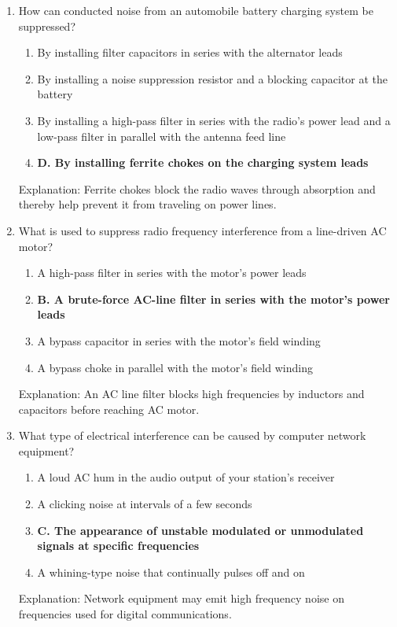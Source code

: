 \begin{enumerate}
   \item How can conducted noise from an automobile battery charging system be suppressed?
     \begin{enumerate}
    \item  By installing filter capacitors in series with the alternator leads
        \item  By installing a noise suppression resistor and a blocking capacitor at the battery
       \item  By installing a high-pass filter in series with the radio's power lead and a low-pass filter in parallel with the antenna feed line
     \item \textbf{D. By installing ferrite chokes on the charging system leads}
       \end{enumerate}
      \textcolor{myred}{Explanation:}
      Ferrite chokes block the radio waves through absorption and thereby help prevent it from traveling on power lines.

  \item What is used to suppress radio frequency interference from a line-driven AC motor?
        \begin{enumerate}
          \item  A high-pass filter in series with the motor's power leads
        \item \textbf{B. A brute-force AC-line filter in series with the motor's power leads}
         \item  A bypass capacitor in series with the motor's field winding
        \item  A bypass choke in parallel with the motor's field winding
        \end{enumerate}
   \textcolor{myred}{Explanation:}
         An AC line filter blocks high frequencies by inductors and capacitors before reaching AC motor.

   \item What type of electrical interference can be caused by computer network equipment?
     \begin{enumerate}
     \item  A loud AC hum in the audio output of your station's receiver
       \item  A clicking noise at intervals of a few seconds
         \item \textbf{C. The appearance of unstable modulated or unmodulated signals at specific frequencies}
         \item  A whining-type noise that continually pulses off and on
     \end{enumerate}
     \textcolor{myred}{Explanation:}
    Network equipment may emit high frequency noise on frequencies used for digital communications.


\end{enumerate}
